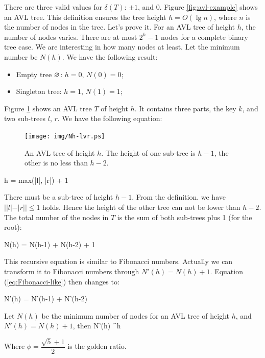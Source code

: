 \documentclass[b5paper]{article}
\begin{document}
There are three valid values for $\delta(T)$: $\pm 1$, and 0. Figure \ref{fig:avl-example} shows an AVL tree. This definition ensures the tree height $h = O(\lg n)$, where $n$ is the number of nodes in the tree. Let's prove it. For an AVL tree of height $h$, the number of nodes varies. There are at most $2^h - 1$ nodes for a complete binary tree case. We are interesting in how many nodes at least. Let the minimum number be $N(h)$. We have the following result:

\begin{itemize}
\item Empty tree $\varnothing$: $h = 0$, $N(0) = 0$;
\item Singleton tree: $h = 1$, $N(1) = 1$;
\end{itemize}

Figure \ref{fig:N-h-relation} shows an AVL tree $T$ of height $h$. It contains three parts, the key $k$, and two sub-trees $l$, $r$. We have the following equation:

\begin{figure}[htbp]
   \centering
   \texttt{[image: img/Nh-lvr.ps]}
   \caption{An AVL tree of height $h$. The height of one sub-tree is $h-1$, the other is no less than $h-2$.}
   \label{fig:N-h-relation}
\end{figure}

\be
  h = max(|l|, |r|) + 1
\ee

There must be a sub-tree of height $h - 1$. From the definition. we have $||l|-|r|| \leq 1$ holds. Hence the height of the other tree can not be lower than $h - 2$. The total number of the nodes in $T$ is the sum of both sub-trees plus 1 (for the root):

\be
  N(h) = N(h-1) + N(h-2) + 1
  \label{eq:Fibonacci-like}
\ee

This recursive equation is similar to Fibonacci numbers. Actually we can transform it to Fibonacci numbers through $N'(h) = N(h) + 1$. Equation (\ref{eq:Fibonacci-like}) then changes to:

\be
  N'(h) = N'(h-1) + N'(h-2)
\ee

\begin{lemma}
\label{lemma:N-phi}
Let $N(h)$ be the minimum number of nodes for an AVL tree of height $h$, and $N'(h) = N(h) + 1$, then
\be
  N'(h) \geq \phi^h
\ee

Where $\phi = \dfrac{\sqrt{5}+1}{2}$ is the golden ratio.
\end{lemma}
\end{document}
